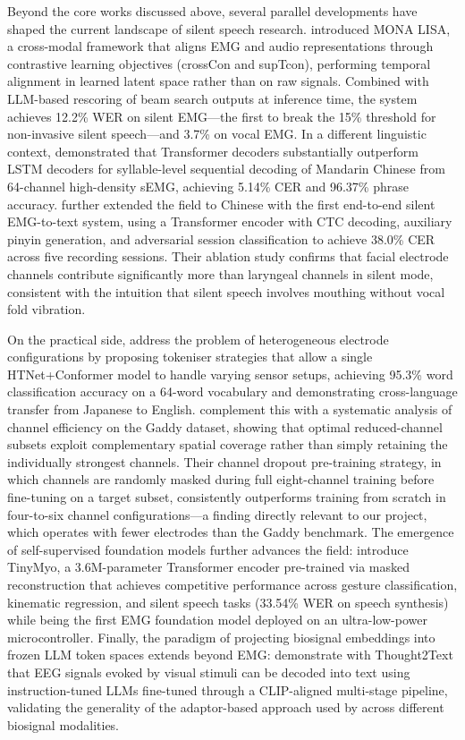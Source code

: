 Beyond the core works discussed above, several parallel developments have shaped the current landscape of silent speech research. \citet{benster2024} introduced MONA LISA, a cross-modal framework that aligns EMG and audio representations through contrastive learning objectives (crossCon and supTcon), performing temporal alignment in learned latent space rather than on raw signals. Combined with LLM-based rescoring of beam search outputs at inference time, the system achieves 12.2\% WER on silent EMG---the first to break the 15\% threshold for non-invasive silent speech---and 3.7\% on vocal EMG. In a different linguistic context, \citet{song2023} demonstrated that Transformer decoders substantially outperform LSTM decoders for syllable-level sequential decoding of Mandarin Chinese from 64-channel high-density sEMG, achieving 5.14\% CER and 96.37\% phrase accuracy. \citet{xie2025} further extended the field to Chinese with the first end-to-end silent EMG-to-text system, using a Transformer encoder with CTC decoding, auxiliary pinyin generation, and adversarial session classification to achieve 38.0\% CER across five recording sessions. Their ablation study confirms that facial electrode channels contribute significantly more than laryngeal channels in silent mode, consistent with the intuition that silent speech involves mouthing without vocal fold vibration.

On the practical side, \citet{inoue2025} address the problem of heterogeneous electrode configurations by proposing tokeniser strategies that allow a single HTNet+Conformer model to handle varying sensor setups, achieving 95.3\% word classification accuracy on a 64-word vocabulary and demonstrating cross-language transfer from Japanese to English. \citet{hwang2026} complement this with a systematic analysis of channel efficiency on the Gaddy dataset, showing that optimal reduced-channel subsets exploit complementary spatial coverage rather than simply retaining the individually strongest channels. Their channel dropout pre-training strategy, in which channels are randomly masked during full eight-channel training before fine-tuning on a target subset, consistently outperforms training from scratch in four-to-six channel configurations---a finding directly relevant to our project, which operates with fewer electrodes than the Gaddy benchmark. The emergence of self-supervised foundation models further advances the field: \citet{fasulo2026} introduce TinyMyo, a 3.6M-parameter Transformer encoder pre-trained via masked reconstruction that achieves competitive performance across gesture classification, kinematic regression, and silent speech tasks (33.54\% WER on speech synthesis) while being the first EMG foundation model deployed on an ultra-low-power microcontroller. Finally, the paradigm of projecting biosignal embeddings into frozen LLM token spaces extends beyond EMG: \citet{mishra2025} demonstrate with Thought2Text that EEG signals evoked by visual stimuli can be decoded into text using instruction-tuned LLMs fine-tuned through a CLIP-aligned multi-stage pipeline, validating the generality of the adaptor-based approach used by \citet{mohapatra2025} across different biosignal modalities.
